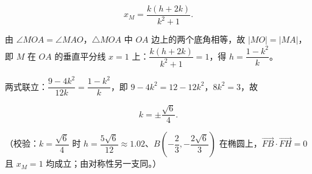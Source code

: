 \begin{answer}
\nopagebreak[4]
\[
x_{M}=\dfrac{k(h+2k)}{k^{2}+1}.
\]

由 \(\angle MOA=\angle MAO\)，\(\triangle MOA\) 中 \(OA\) 边上的两个底角相等，故 \(|MO|=|MA|\)，即 \(M\) 在 \(OA\) 的垂直平分线 \(x=1\) 上：\(\dfrac{k(h+2k)}{k^{2}+1}=1\)，得 \(h=\dfrac{1-k^{2}}{k}\)。

两式联立：\(\dfrac{9-4k^{2}}{12k}=\dfrac{1-k^{2}}{k}\)，即 \(9-4k^{2}=12-12k^{2}\)，\(8k^{2}=3\)，故

\nopagebreak[4]
\[
k=\pm\dfrac{\sqrt{6}}{4}.
\]

（校验：\(k=\dfrac{\sqrt{6}}{4}\) 时 \(h=\dfrac{5\sqrt{6}}{12}\approx 1.02\)、\(B\left(-\dfrac{2}{3},-\dfrac{2\sqrt{6}}{3}\right)\) 在椭圆上，\(\overrightarrow{FB}\cdot\overrightarrow{FH}=0\) 且 \(x_{M}=1\) 均成立；由对称性另一支同。）



\end{answer}
